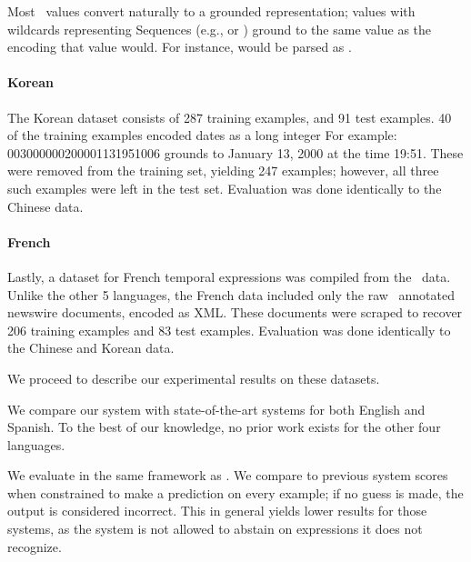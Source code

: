 Most \timex\ values convert naturally to a grounded representation; values
  with wildcards representing Sequences (e.g.,  or )
  ground to the same value as the  encoding that value would.
For instance,  would be parsed as .

\paragraph{Korean}
The Korean dataset consists of 287 training examples, and 91 test examples.
40 of the training examples encoded dates as a long integer
For example: 003000000200001131951006 grounds to January 13, 2000 at the time
  19:51.
These were removed from the training set, yielding 247 examples; however,
  all three such examples were left in the test set.
Evaluation was done identically to the Chinese data.

\paragraph{French}
Lastly, a dataset for French temporal expressions was compiled from the
  \tempeval\ data.
Unlike the other 5 languages, the French data included only the raw 
  \timex\ annotated newswire documents, encoded as XML.
These documents were scraped to recover 206 training examples and 83 test
  examples.
Evaluation was done identically to the Chinese and Korean data.

We proceed to describe our experimental results on these datasets.

We compare our system with state-of-the-art systems for both English and
  Spanish.
To the best of our knowledge, no prior work exists for the other four languages.

We evaluate in the same framework as \me.
We compare to 
	previous system scores when constrained to make a prediction on every
	example; if no guess is made, the output is considered incorrect.
This in general yields lower results for those systems,
  as the system is not allowed to
	abstain on expressions it does not recognize.

